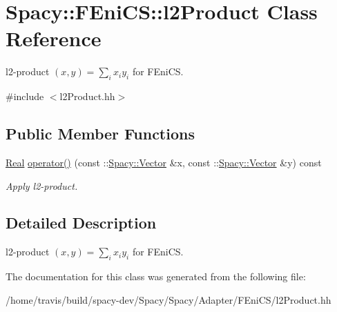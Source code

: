 \hypertarget{classSpacy_1_1FEniCS_1_1l2Product}{\section{Spacy\-:\-:F\-Eni\-C\-S\-:\-:l2\-Product Class Reference}
\label{classSpacy_1_1FEniCS_1_1l2Product}
}


l2-\/product $(x,y) = \sum_i x_i y_i $ for F\-Eni\-C\-S.  




{\ttfamily \#include $<$l2\-Product.\-hh$>$}

\subsection*{Public Member Functions}
\begin{DoxyCompactItemize}
\item 
\hypertarget{classSpacy_1_1FEniCS_1_1l2Product_a795fc0d8cbced556168163265ac21406}{\hyperlink{classSpacy_1_1Real}{Real} \hyperlink{classSpacy_1_1FEniCS_1_1l2Product_a795fc0d8cbced556168163265ac21406}{operator()} (const \-::\hyperlink{classSpacy_1_1Vector}{Spacy\-::\-Vector} \&x, const \-::\hyperlink{classSpacy_1_1Vector}{Spacy\-::\-Vector} \&y) const }\label{classSpacy_1_1FEniCS_1_1l2Product_a795fc0d8cbced556168163265ac21406}

\begin{DoxyCompactList}\small\item\em Apply l2-\/product. \end{DoxyCompactList}\end{DoxyCompactItemize}


\subsection{Detailed Description}
l2-\/product $(x,y) = \sum_i x_i y_i $ for F\-Eni\-C\-S. 

The documentation for this class was generated from the following file\-:\begin{DoxyCompactItemize}
\item 
/home/travis/build/spacy-\/dev/\-Spacy/\-Spacy/\-Adapter/\-F\-Eni\-C\-S/l2\-Product.\-hh\end{DoxyCompactItemize}
